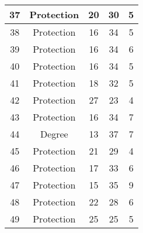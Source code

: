 \documentclass[results.tex]{subfiles}
\begin{document}
\begin{center}
\begin{tabular}{| c || c | c | c | c |}
            \hline
            37                      & Protection                   & 20                     & 30                      & 5                    \\
            \hline
            38                      & Protection                   & 16                     & 34                      & 5                    \\
            \hline
            39                      & Protection                   & 16                     & 34                      & 6                    \\
            \hline
            40                      & Protection                   & 16                     & 34                      & 5                    \\
            \hline
            41                      & Protection                   & 18                     & 32                      & 5                    \\
            \hline
            42                      & Protection                   & 27                     & 23                      & 4                    \\
            \hline
            43                      & Protection                   & 16                     & 34                      & 7                    \\
            \hline
            44                      & Degree                       & 13                     & 37                      & 7                    \\
            \hline
            45                      & Protection                   & 21                     & 29                      & 4                    \\
            \hline
            46                      & Protection                   & 17                     & 33                      & 6                    \\
            \hline
            47                      & Protection                   & 15                     & 35                      & 9                    \\
            \hline
            48                      & Protection                   & 22                     & 28                      & 6                    \\
            \hline
            49                      & Protection                   & 25                     & 25                      & 5                    \\
            \hline
        \end{tabular}
    \end{center}
\end{document}
